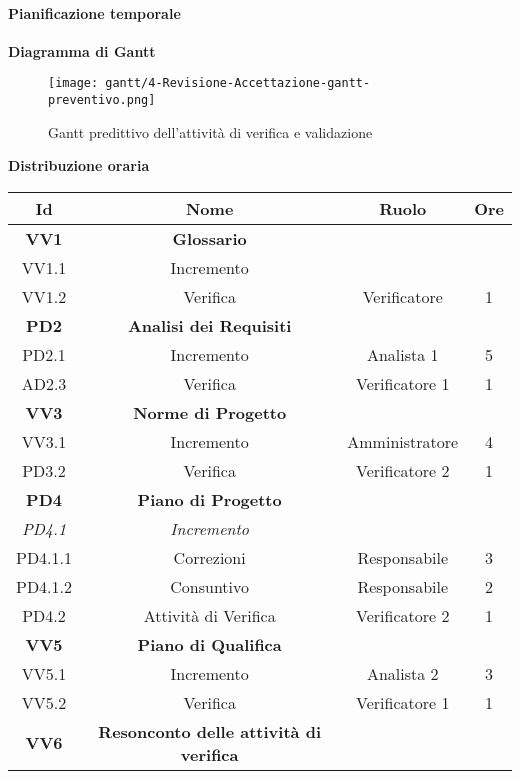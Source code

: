 \documentclass{scalatekids-article}
\begin{document}
\newpage
\paragraph{Pianificazione temporale}
\textbf{Diagramma di Gantt}
\begin{figure}[H]
  \texttt{[image: gantt/4-Revisione-Accettazione-gantt-preventivo.png]}
  \caption{Gantt predittivo dell'attività di verifica e validazione}
\end{figure}

\newpage
\textbf{Distribuzione oraria}
\scriptsize
\begin{center}
  \begin{tabular}{| c | c | c | c |}
    \hline
    \textbf{Id} & \textbf{Nome} & \textbf{Ruolo} & \textbf{Ore}\\
    \hline
    \textbf{VV1} & \textbf{Glossario} & &\\
    \hline
    VV1.1 & Incremento & &\\
    \hline
    VV1.2 & Verifica & Verificatore & 1\\
    \hline
    \textbf{PD2} & \textbf{Analisi dei Requisiti} & &\\
    \hline
    PD2.1 & Incremento & Analista 1 & 5\\
    \hline
    AD2.3 & Verifica & Verificatore 1 & 1\\
    \hline
    \textbf{VV3} & \textbf{Norme di Progetto} & &\\
    \hline
    VV3.1 & Incremento & Amministratore & 4\\
    \hline
    PD3.2 & Verifica & Verificatore 2 & 1\\
    \hline
    \textbf{PD4} & \textbf{Piano di Progetto} & &\\
    \hline
    \textit{PD4.1} & \textit{Incremento} & &\\
    \hline
    PD4.1.1 & Correzioni & Responsabile & 3\\
    \hline
    PD4.1.2 & Consuntivo & Responsabile & 2\\
    \hline
    PD4.2 & Attività di Verifica & Verificatore 2 & 1\\
    \hline
    \textbf{VV5} & \textbf{Piano di Qualifica} & &\\
    \hline
    VV5.1 & Incremento & Analista 2 &3\\
    \hline
    VV5.2 & Verifica & Verificatore 1 &1\\
    \hline
    \textbf{VV6} & \textbf{Resonconto delle attività di verifica} & &\\

\end{tabular}
\end{center}
\end{document}
